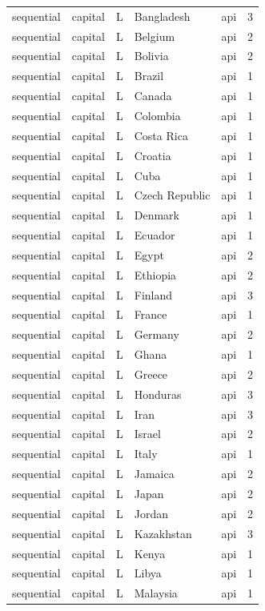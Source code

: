 \begin{tabular}{lllllr}
sequential & capital & L & Bangladesh & api & 3 \\
sequential & capital & L & Belgium & api & 2 \\
sequential & capital & L & Bolivia & api & 2 \\
sequential & capital & L & Brazil & api & 1 \\
sequential & capital & L & Canada & api & 1 \\
sequential & capital & L & Colombia & api & 1 \\
sequential & capital & L & Costa Rica & api & 1 \\
sequential & capital & L & Croatia & api & 1 \\
sequential & capital & L & Cuba & api & 1 \\
sequential & capital & L & Czech Republic & api & 1 \\
sequential & capital & L & Denmark & api & 1 \\
sequential & capital & L & Ecuador & api & 1 \\
sequential & capital & L & Egypt & api & 2 \\
sequential & capital & L & Ethiopia & api & 2 \\
sequential & capital & L & Finland & api & 3 \\
sequential & capital & L & France & api & 1 \\
sequential & capital & L & Germany & api & 2 \\
sequential & capital & L & Ghana & api & 1 \\
sequential & capital & L & Greece & api & 2 \\
sequential & capital & L & Honduras & api & 3 \\
sequential & capital & L & Iran & api & 3 \\
sequential & capital & L & Israel & api & 2 \\
sequential & capital & L & Italy & api & 1 \\
sequential & capital & L & Jamaica & api & 2 \\
sequential & capital & L & Japan & api & 2 \\
sequential & capital & L & Jordan & api & 2 \\
sequential & capital & L & Kazakhstan & api & 3 \\
sequential & capital & L & Kenya & api & 1 \\
sequential & capital & L & Libya & api & 1 \\
sequential & capital & L & Malaysia & api & 1 \\

\end{tabular}

